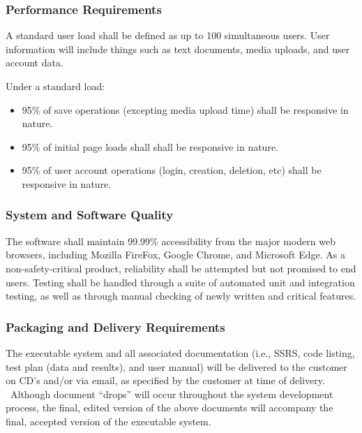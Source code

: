 \documentclass[letterpaper, 10pt, draftclsnofoot, compsoc, onecolumn]{IEEEtran}
\begin{document}
{\subsubsection[Performance Requirements]{\rmfamily\bfseries\color{black} Performance Requirements}

{\noindent
A standard user load shall be defined as up to 100 simultaneous users. User information
will include things such as text documents, media uploads, and user account data.

Under a standard load:
\begin{itemize}
  \item 95\% of save operations (excepting media upload time) shall be responsive in 
  nature.
  \item 95\% of initial page loads shall shall be responsive in 
  nature.
  \item 95\% of user account operations (login, creation, deletion, etc) shall be 
  responsive in nature.
\end{itemize}}

\subsubsection[System and Software Quality]{\rmfamily\bfseries\color{black} System and Software Quality}

The software shall maintain 99.99\% accessibility from the major modern web browsers, including Mozilla FireFox, 
Google Chrome, and Microsoft Edge.
As a non-safety-critical product, reliability shall be attempted but not promised
to end users. Testing shall be handled through a suite of automated unit and integration testing, as well as
through manual checking of newly written and critical features.

\subsubsection[Packaging and Delivery Requirements]{\rmfamily\bfseries\color{black} Packaging and Delivery Requirements}

{\noindent 
The executable system and all associated documentation (i.e., SSRS,
code listing, test plan (data and results), and user manual) will be
delivered to the customer on CD{\textquoteright}s and/or via email, as
specified by the customer at time of delivery. \ Although document
{\textquotedblleft}drops{\textquotedblright} will occur throughout the
system development process, the final, edited version of the above
documents will accompany the final, accepted version of the executable
system.}

}
\end{document}
